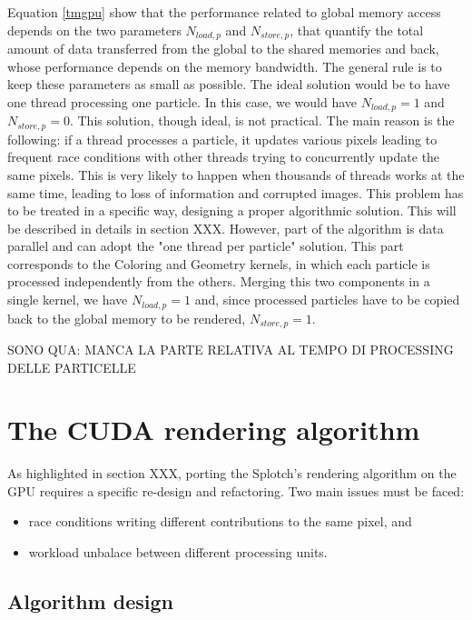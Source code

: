 \documentclass[11pt]{article}
\begin{document}
Equation \eqref{tmgpu} show that the performance related to global memory access
depends on the two parameters $N_{load,p}$ and $N_{store,p}$, that quantify the 
total amount of data transferred from the global to the shared memories and back,
whose performance depends on the memory bandwidth.
The general rule is to keep these parameters
as small as possible. 
The ideal solution would be to have one thread 
processing one particle. In this case, we would have $N_{load,p} = 1$ and $N_{store,p} = 0$.
This solution, though ideal, is not practical. The main reason is the following: 
if a thread processes a particle, it updates various pixels leading to frequent 
race conditions with other threads trying to concurrently update the same pixels.
This is very likely to happen when thousands of threads works at the same time, 
leading to loss of information and corrupted images. This problem has to be treated 
in a specific way, designing a proper algorithmic solution. This will be 
described in details in section XXX. However, part 
of the algorithm is data parallel and can adopt the "one thread per particle" solution.
This part corresponds to the Coloring and Geometry kernels, in which each particle 
is processed independently from the others. Merging this two components in a single
kernel, we have $N_{load,p} = 1$ and, since processed particles
have to be copied back to the global memory to be rendered, $N_{store,p} = 1$. 

SONO QUA: MANCA LA PARTE RELATIVA AL TEMPO DI PROCESSING DELLE PARTICELLE

\section{The CUDA rendering algorithm}

As highlighted in section XXX, porting the Splotch's rendering 
algorithm on the GPU requires a specific re-design and refactoring.
Two main issues must be faced:
\begin{itemize}
\item 
race conditions writing different contributions to the same pixel, and
\item
workload unbalace between different processing units. 
\end{itemize}

\subsection{Algorithm design}
\end{document}
